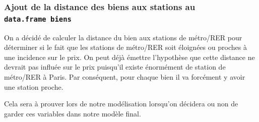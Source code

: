 \documentclass[french,]{article}
\newenvironment{Shaded}{\begin{snugshade}}{\end{snugshade}}
\newcommand{\CommentTok}[1]{\textcolor[rgb]{0.56,0.35,0.01}{\textit{#1}}}
\newcommand{\ControlFlowTok}[1]{\textcolor[rgb]{0.13,0.29,0.53}{\textbf{#1}}}
\newcommand{\DataTypeTok}[1]{\textcolor[rgb]{0.13,0.29,0.53}{#1}}
\newcommand{\DecValTok}[1]{\textcolor[rgb]{0.00,0.00,0.81}{#1}}
\newcommand{\FloatTok}[1]{\textcolor[rgb]{0.00,0.00,0.81}{#1}}
\newcommand{\KeywordTok}[1]{\textcolor[rgb]{0.13,0.29,0.53}{\textbf{#1}}}
\newcommand{\NormalTok}[1]{#1}
\newcommand{\OperatorTok}[1]{\textcolor[rgb]{0.81,0.36,0.00}{\textbf{#1}}}
\begin{document}
\hypertarget{ajout-de-la-distance-des-biens-aux-stations-au-data.frame-biens}{%
\subsubsection{\texorpdfstring{Ajout de la distance des biens aux
stations au
\texttt{data.frame\ biens}}{Ajout de la distance des biens aux stations au data.frame biens}}\label{ajout-de-la-distance-des-biens-aux-stations-au-data.frame-biens}}

On a décidé de calculer la distance du bien aux stations de métro/RER
pour déterminer si le fait que les stations de métro/RER soit éloignées
ou proches à une incidence sur le prix. On peut déjà émettre l'hypothèse
que cette distance ne devrait pas influée sur le prix puisqu'il existe
énormément de station de métro/RER à Paris. Par conséquent, pour chaque
bien il va forcément y avoir une station proche.

Cela sera à prouver lors de notre modélisation lorsqu'on décidera ou non
de garder ces variables dans notre modèle final.

\begin{Shaded}
\end{Shaded}
\end{document}

